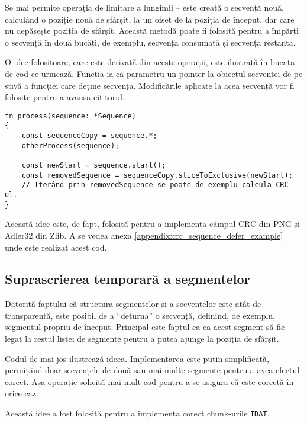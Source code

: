 \documentclass[a4paper,12pt]{report}
\begin{document}
Se mai permite operația de limitare a lungimii -- este creată o secvență nouă,
calculând o poziție nouă de sfârșit, la un ofset de la poziția de început,
dar care nu depășește poziția de sfârșit.
Această metodă poate fi folosită pentru a împărți o secvență în două bucăți, de exemplu,
secvența consumată și secvența restantă.

O idee folositoare, care este derivată din aceste operații, este ilustrată în bucata de cod ce urmează.
Funcția ia ca parametru un pointer la obiectul secvenței de pe stivă a funcției care deține secvența.
Modificările aplicate la acea secvență vor fi folosite pentru a avansa cititorul.

\begin{verbatim}
fn process(sequence: *Sequence)
{
    const sequenceCopy = sequence.*;
    otherProcess(sequence);

    const newStart = sequence.start();
    const removedSequence = sequenceCopy.sliceToExclusive(newStart);
    // Iterând prin removedSequence se poate de exemplu calcula CRC-ul.
}
\end{verbatim}

Această idee este, de fapt, folosită pentru a implementa câmpul \ac{CRC} din \ac{PNG} și Adler32 din Zlib.
A se vedea anexa \ref{appendix:crc_sequence_defer_example} unde este realizat acest cod.

\subsection{Suprascrierea temporară a segmentelor}

Datorită faptului că structura segmentelor și a secvențelor este atât de transparentă,
este posibil de a ``deturna'' o secvență, definind, de exemplu, segmentul propriu de început.
Principal este faptul ca ca acest segment să fie legat la restul listei de segmente pentru a putea ajunge la poziția de sfârșit.

Codul de mai jos ilustrează ideea.
Implementarea este puțin simplificată,
permițând doar secvențele de două sau mai multe segmente pentru a avea efectul corect.
Așa operație solicită mai mult cod pentru a se asigura că este corectă în orice caz.

Această idee a fost folosită pentru a implementa corect chunk-urile \texttt{IDAT}.
\end{document}

